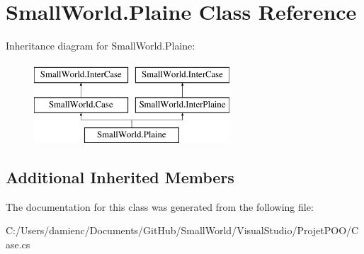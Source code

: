 \hypertarget{class_small_world_1_1_plaine}{\section{Small\-World.\-Plaine Class Reference}
\label{class_small_world_1_1_plaine}
}
Inheritance diagram for Small\-World.\-Plaine\-:\begin{figure}[H]
\begin{center}
\leavevmode
\includegraphics[height=3.000000cm]{class_small_world_1_1_plaine}
\end{center}
\end{figure}
\subsection*{Additional Inherited Members}


The documentation for this class was generated from the following file\-:\begin{DoxyCompactItemize}
\item 
C\-:/\-Users/damienc/\-Documents/\-Git\-Hub/\-Small\-World/\-Visual\-Studio/\-Projet\-P\-O\-O/Case.\-cs\end{DoxyCompactItemize}

